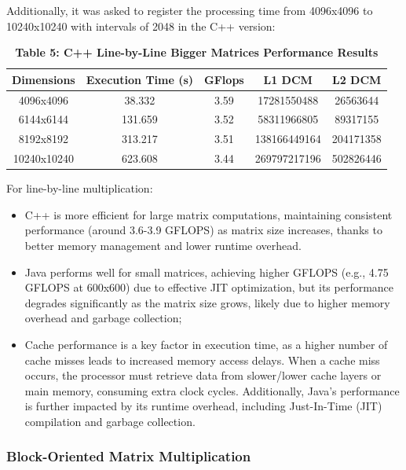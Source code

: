 \documentclass{article}
\begin{document}
Additionally, it was asked to register the processing time from 4096x4096 to 10240x10240 with intervals of 2048 in the C++ version:

\begin{table}[H]
\centering

\caption*{\textbf{Table 5: C++ Line-by-Line Bigger Matrices Performance Results}}
\begin{tabular}{||c | c | c | c | c||} 
 \hline
 \textbf{Dimensions} & \textbf{Execution Time (s)} & \textbf{GFlops} & \textbf{L1 DCM} & \textbf{L2 DCM} \\  
 \hline \hline
 4096x4096  & 38.332   & 3.59   & 17281550488   & 26563644    \\  
 \hline
 6144x6144  & 131.659  & 3.52   & 58311966805   & 89317155    \\  
 \hline
 8192x8192  & 313.217  & 3.51   & 138166449164  & 204171358   \\  
 \hline
 10240x10240 & 623.608  & 3.44   & 269797217196  & 502826446   \\  
 \hline
\end{tabular}
\end{table}

For line-by-line multiplication:

\begin{itemize}
    \item C++ is more efficient for large matrix computations, maintaining consistent performance (around 3.6-3.9 GFLOPS) as matrix size increases, thanks to better memory management and lower runtime overhead.
    \item Java performs well for small matrices, achieving higher GFLOPS (e.g., 4.75 GFLOPS at 600x600) due to effective JIT optimization, but its performance degrades significantly as the matrix size grows, likely due to higher memory overhead and garbage collection;
    \item Cache performance is a key factor in execution time, as a higher number of cache misses leads to increased memory access delays. When a cache miss occurs, the processor must retrieve data from slower/lower cache layers or main memory, consuming extra clock cycles. Additionally, Java's performance is further impacted by its runtime overhead, including Just-In-Time (JIT) compilation and garbage collection.
\end{itemize}

\subsubsection{Block-Oriented Matrix Multiplication}
\end{document}
